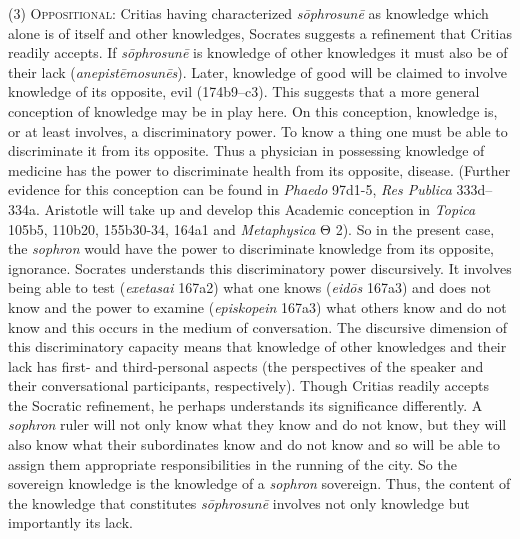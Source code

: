 (3) \textsc{Oppositional}: Critias having characterized \emph{sōphrosunē} as knowledge which alone is of itself and other knowledges, Socrates suggests a refinement that Critias readily accepts. If \emph{sōphrosunē} is knowledge of other knowledges it must also be of their lack (\emph{anepistēmosunēs}). Later, knowledge of good will be claimed to involve knowledge of its opposite, evil (174b9–c3). This suggests that a more general conception of knowledge may be in play here. On this conception, knowledge is, or at least involves, a discriminatory power. To know a thing one must be able to discriminate it from its opposite.  Thus a physician in possessing knowledge of medicine has the power to discriminate health from its opposite, disease. (Further evidence for this conception can be found in \emph{Phaedo} 97d1-5, \emph{Res Publica} 333d–334a. Aristotle will take up and develop this Academic conception in \emph{Topica} 105b5, 110b20, 155b30-34, 164a1 and \emph{Metaphysica} {\sbl Θ} 2). So in the present case, the \emph{sophron} would have the power to discriminate knowledge from its opposite, ignorance. Socrates understands this discriminatory power discursively. It involves being able to test (\emph{exetasai} 167a2) what one knows (\emph{eidōs} 167a3) and does not know and the power to examine (\emph{episkopein} 167a3) what others know and do not know and this occurs in the medium of conversation. The discursive dimension of this discriminatory capacity means that knowledge of other knowledges and their lack has first- and third-personal aspects (the perspectives of the speaker and their conversational participants, respectively). Though Critias readily accepts the Socratic refinement, he perhaps understands its significance differently. A \emph{sophron} ruler will not only know what they know and do not know, but they will also know what their subordinates know and do not know and so will be able to assign them appropriate responsibilities in the running of the city. So the sovereign knowledge is the knowledge of a \emph{sophron} sovereign. Thus, the content of the knowledge that constitutes \emph{sōphrosunē} involves not only knowledge but importantly its lack. 

